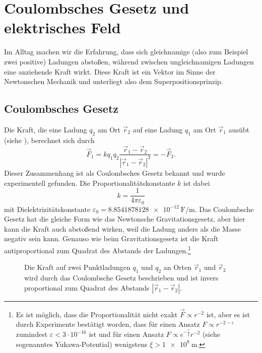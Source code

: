 \section{Coulombsches Gesetz und elektrisches Feld}

Im Alltag machen wir die Erfahrung, dass sich gleichnamige (also zum Beispiel zwei positive) Ladungen abstoßen, während zwischen ungleichnamigen Ladungen eine anziehende Kraft wirkt. Diese Kraft ist ein Vektor im Sinne der Newtonschen Mechanik und unterliegt also dem Superpositionsprinzip.


\subsection{Coulombsches Gesetz}

Die Kraft, die eine Ladung $q_{2}$ am Ort $\vec {r}_{2}$ auf eine Ladung $q_{1}$ am Ort $\vec {r}_{1}$ ausübt (siehe ), berechnet sich durch
\begin{equation}
	\label{3.1}
	\boxed{\vec {F}_{1}=kq_{1}q_{2}\frac{\vec {r}_{1}-\vec {r}_{2}}{\left| \vec {r}_{1}-\vec {r}_{2}\right| ^{3}}=-\vec {F}_{2}.}
\end{equation}
Dieser Zusammenhang ist als Coulombsches Gesetz bekannt und wurde experimentell gefunden. Die Proportionalitätskonstante $k$ ist dabei
\begin{equation*}
	k=\frac{1}{4\pi \varepsilon _{0}}
\end{equation*}
mit Dielektrizitätskonstante $\varepsilon _{0}=\SI{8,8541878128e-12}{\farad\per\m}$. Das Coulombsche Gesetz hat die gleiche Form wie das Newtonsche Gravitationsgesetz, aber hier kann die Kraft auch abstoßend wirken, weil die Ladung anders als die Masse negativ sein kann. Genauso wie beim Gravitationsgesetz ist die Kraft antiproportional zum Quadrat des Abstands der Ladungen.\footnote{Es ist möglich, dass die Proportionalität nicht exakt $\vec {F}\propto r^{-2}$ ist, aber es ist durch Experimente bestätigt worden, dass für einen Ansatz $F\propto r^{-2-\varepsilon }$ zumindest $\varepsilon <3\cdot 10^{-16}$ ist und für einen Ansatz $F\propto e^{-\frac{r}{\xi }}r^{-2}$ (siehe sogenanntes Yukawa-Potential) wenigstens $\xi >\SI{1e8}{\m}$. }

\begin{figure}[htb]
	\centering
	\tfigCoulombPointCharges
	\caption{Die Kraft auf zwei Punktladungen $q_1$ und $q_2$ an Orten $\vec r_1$ und $\vec r_2$ wird durch das Coulombsche Gesetz beschrieben und ist invers proportional zum Quadrat des Abstands $\left|\vec r_1-\vec r_2\right|$. }
	\label{fig:coulomb_point_charges}
\end{figure}


